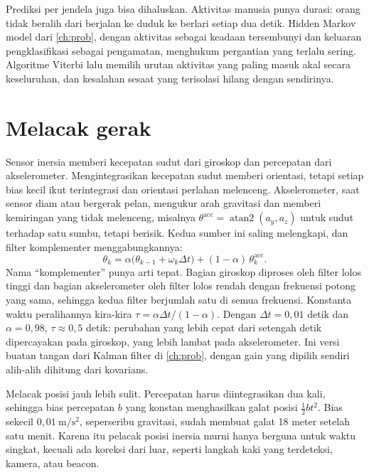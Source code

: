 Prediksi per jendela juga bisa dihaluskan. Aktivitas manusia punya durasi: orang tidak beralih dari berjalan ke duduk ke berlari
setiap dua detik. Hidden Markov model dari \cref{ch:prob}, dengan aktivitas sebagai keadaan tersembunyi dan keluaran pengklasifikasi
sebagai pengamatan, menghukum pergantian yang terlalu sering. Algoritme Viterbi lalu memilih urutan aktivitas yang paling masuk akal
secara keseluruhan, dan kesalahan sesaat yang terisolasi hilang dengan sendirinya.

\section{Melacak gerak}

Sensor inersia memberi kecepatan sudut dari giroskop dan percepatan dari akselerometer. Mengintegrasikan kecepatan
sudut memberi orientasi, tetapi setiap bias kecil ikut terintegrasi dan orientasi perlahan melenceng. Akselerometer,
saat sensor diam atau bergerak pelan, mengukur arah gravitasi dan memberi kemiringan yang tidak melenceng,
misalnya $\theta^{\mathrm{acc}}=\operatorname{atan2}(a_y,a_z)$ untuk sudut terhadap satu sumbu, tetapi berisik.
Kedua sumber ini saling melengkapi, dan filter komplementer menggabungkannya:
\begin{equation}
\theta_k=\alpha\big(\theta_{k-1}+\omega_k\Delta t\big)+(1-\alpha)\,\theta^{\mathrm{acc}}_k.
\end{equation}
Nama ``komplementer'' punya arti tepat. Bagian giroskop diproses oleh filter lolos tinggi dan bagian akselerometer
oleh filter lolos rendah dengan frekuensi potong yang sama, sehingga kedua filter berjumlah satu di semua frekuensi.
Konstanta waktu peralihannya kira-kira $\tau=\alpha\Delta t/(1-\alpha)$. Dengan $\Delta t=0{,}01$ detik dan $\alpha=0{,}98$,
$\tau\approx0{,}5$ detik: perubahan yang lebih cepat dari setengah detik dipercayakan pada giroskop, yang lebih lambat
pada akselerometer. Ini versi buatan tangan dari Kalman filter di \cref{ch:prob}, dengan gain yang dipilih sendiri
alih-alih dihitung dari kovarians.

Melacak posisi jauh lebih sulit. Percepatan harus diintegrasikan dua kali, sehingga bias percepatan $b$ yang konstan
menghasilkan galat posisi $\tfrac12bt^2$. Bias sekecil $0{,}01\ \mathrm{m/s^2}$, seperseribu gravitasi, sudah membuat
galat 18 meter setelah satu menit. Karena itu pelacak posisi inersia murni hanya berguna untuk waktu singkat, kecuali
ada koreksi dari luar, seperti langkah kaki yang terdeteksi, kamera, atau beacon.

